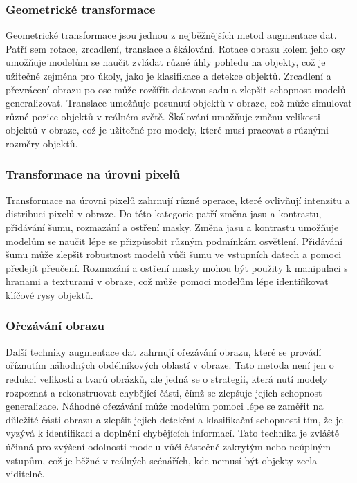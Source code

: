 \documentclass[male,czech,api_ing]{thesis}
\begin{document}
\subsubsection{Geometrické transformace}
Geometrické transformace jsou jednou z nejběžnějších metod augmentace dat. Patří sem rotace, zrcadlení, translace a škálování. Rotace obrazu kolem jeho osy umožňuje modelům se naučit zvládat různé úhly pohledu na objekty, což je užitečné zejména pro úkoly, jako je klasifikace a detekce objektů. Zrcadlení a převrácení obrazu po ose může rozšířit datovou sadu a zlepšit schopnost modelů generalizovat. Translace umožňuje posunutí objektů v obraze, což může simulovat různé pozice objektů v reálném světě. Škálování umožňuje změnu velikosti objektů v obraze, což je užitečné pro modely, které musí pracovat s různými rozměry objektů. \cite{AugmentationSurvey}

\subsubsection{Transformace na úrovni pixelů}
Transformace na úrovni pixelů zahrnují různé operace, které ovlivňují intenzitu a distribuci pixelů v obraze. Do této kategorie patří změna jasu a kontrastu, přidávání šumu, rozmazání a ostření masky. Změna jasu a kontrastu umožňuje modelům se naučit lépe se přizpůsobit různým podmínkám osvětlení. Přidávání šumu může zlepšit robustnost modelů vůči šumu ve vstupních datech a pomoci předejít přeučení. Rozmazání a ostření masky mohou být použity k manipulaci s hranami a texturami v obraze, což může pomoci modelům lépe identifikovat klíčové rysy objektů. \cite{AugmentationSurvey}

\subsubsection{Ořezávání obrazu}
Další techniky augmentace dat zahrnují ořezávání obrazu, které se provádí oříznutím náhodných obdélníkových oblastí v obraze. Tato metoda není jen o redukci velikosti a tvarů obrázků, ale jedná se o strategii, která nutí modely rozpoznat a rekonstruovat chybějící části, čímž se zlepšuje jejich schopnost generalizace. Náhodné ořezávání může modelům pomoci lépe se zaměřit na důležité části obrazu a zlepšit jejich detekční a klasifikační schopnosti tím, že je vyzývá k identifikaci a doplnění chybějících informací. Tato technika je zvláště účinná pro zvýšení odolnosti modelu vůči částečně zakrytým nebo neúplným vstupům, což je běžné v reálných scénářích, kde nemusí být objekty zcela viditelné. \cite{AugmentationSurvey}
\end{document}
